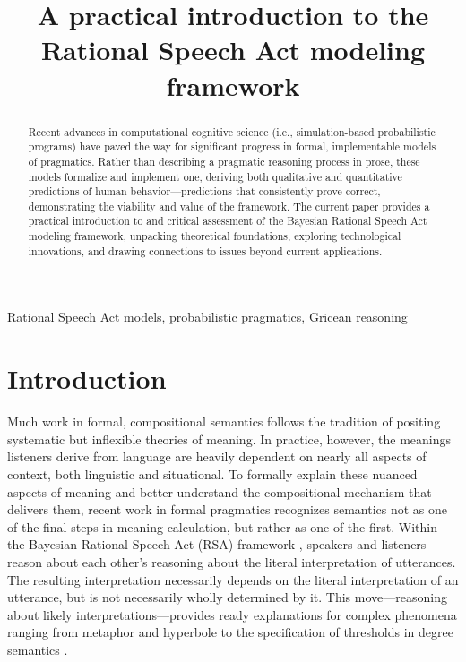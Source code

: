\documentclass{sp}
\title[Practical introduction to RSA]{A practical introduction to the Rational Speech Act modeling framework}
\author[]{
	\spauthor{Gregory Scontras \\ \institute{University of California, Irvine}} \AND
	\spauthor{Michael Henry Tessler \\ \institute{Massachusetts Institute of Technology}} \AND
	\spauthor{Michael Franke \\ \institute{University of Osnabr\"{u}ck}}
}
\begin{document}
\maketitle

\begin{abstract}
	Recent advances in computational cognitive science (i.e., simulation-based probabilistic programs) have paved the way for significant progress in formal, implementable models of pragmatics. Rather than describing a pragmatic reasoning process in prose, these models formalize and implement one, deriving both qualitative and quantitative predictions of human behavior---predictions that consistently prove correct, demonstrating the viability and value of the framework. The current paper provides a practical introduction to and critical assessment of the Bayesian Rational Speech Act modeling framework, unpacking theoretical foundations, exploring technological innovations, and drawing connections to issues beyond current applications. 
\end{abstract}

\begin{keywords}
	Rational Speech Act models, probabilistic pragmatics, Gricean reasoning
\end{keywords}

\section{Introduction}

Much work in formal, compositional semantics follows the tradition of positing systematic but inflexible theories of meaning. In practice, however, the meanings listeners derive from language are heavily dependent on nearly all aspects of context, both linguistic and situational. To formally explain these nuanced aspects of meaning and better understand the compositional mechanism that delivers them, recent work in formal pragmatics recognizes semantics not as one of the final steps in meaning calculation, but rather as one of the first. Within the Bayesian Rational Speech Act (RSA) framework \citep{goodmanfrank2016,frankejaeger2016}, speakers and listeners reason about each other's reasoning about the literal interpretation of utterances. The resulting interpretation necessarily depends on the literal interpretation of an utterance, but is not necessarily wholly determined by it. This move---reasoning about likely interpretations---provides ready explanations for complex phenomena ranging from metaphor \citep{kaoetal2014metaphor} and hyperbole \citep{kaoetal2014} to the specification of thresholds in degree semantics \citep{lassitergoodman2013}.
\end{document}
